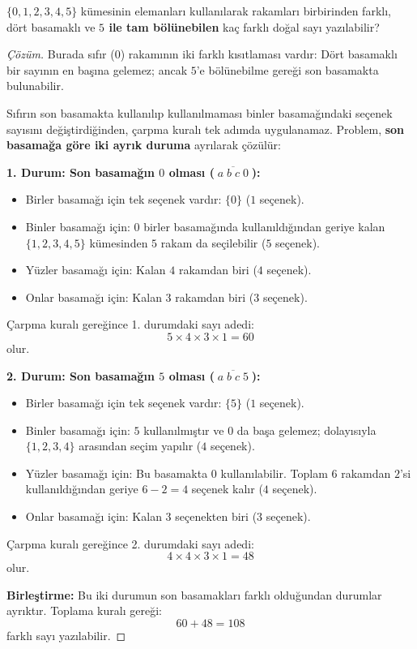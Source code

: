 \begin{example}
$\{0, 1, 2, 3, 4, 5\}$ kümesinin elemanları kullanılarak rakamları birbirinden farklı, dört basamaklı ve \textbf{$5$ ile tam bölünebilen} kaç farklı doğal sayı yazılabilir?
\end{example}
\begin{proof}[Çözüm]
Burada sıfır ($0$) rakamının iki farklı kısıtlaması vardır: Dört basamaklı bir sayının en başına gelemez; ancak $5$'e bölünebilme gereği son basamakta bulunabilir.

Sıfırın son basamakta kullanılıp kullanılmaması binler basamağındaki seçenek sayısını değiştirdiğinden, çarpma kuralı tek adımda uygulanamaz. Problem, \textbf{son basamağa göre iki ayrık duruma} ayrılarak çözülür:

\textbf{1. Durum: Son basamağın $0$ olması ($\overline{\;a\;b\;c\;0\;}$):}
\begin{itemize}
  \item Birler basamağı için tek seçenek vardır: $\{0\}$ ($1$ seçenek).
  \item Binler basamağı için: $0$ birler basamağında kullanıldığından geriye kalan $\{1, 2, 3, 4, 5\}$ kümesinden $5$ rakam da seçilebilir ($5$ seçenek).
  \item Yüzler basamağı için: Kalan $4$ rakamdan biri ($4$ seçenek).
  \item Onlar basamağı için: Kalan $3$ rakamdan biri ($3$ seçenek).
\end{itemize}
Çarpma kuralı gereğince 1. durumdaki sayı adedi:
\[ 5 \times 4 \times 3 \times 1 = 60 \]
olur.

\textbf{2. Durum: Son basamağın $5$ olması ($\overline{\;a\;b\;c\;5\;}$):}
\begin{itemize}
  \item Birler basamağı için tek seçenek vardır: $\{5\}$ ($1$ seçenek).
  \item Binler basamağı için: $5$ kullanılmıştır ve $0$ da başa gelemez; dolayısıyla $\{1, 2, 3, 4\}$ arasından seçim yapılır ($4$ seçenek).
  \item Yüzler basamağı için: Bu basamakta $0$ kullanılabilir. Toplam $6$ rakamdan $2$'si kullanıldığından geriye $6 - 2 = 4$ seçenek kalır ($4$ seçenek).
  \item Onlar basamağı için: Kalan $3$ seçenekten biri ($3$ seçenek).
\end{itemize}
Çarpma kuralı gereğince 2. durumdaki sayı adedi:
\[ 4 \times 4 \times 3 \times 1 = 48 \]
olur.

\textbf{Birleştirme:}
Bu iki durumun son basamakları farklı olduğundan durumlar ayrıktır. Toplama kuralı gereği:
\[ 60 + 48 = 108 \]
farklı sayı yazılabilir.
\end{proof}

